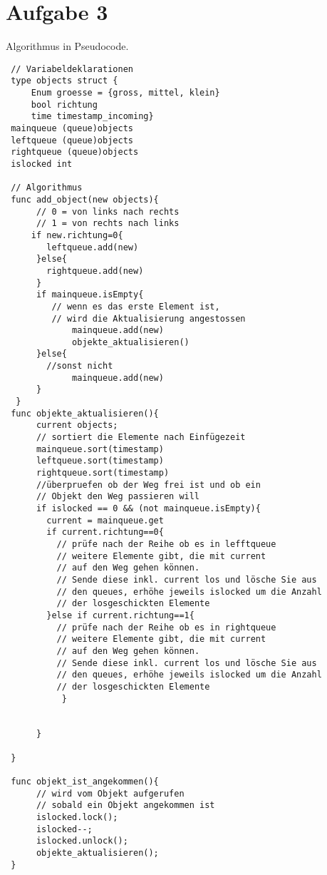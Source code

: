 \documentclass[11pt,a4paper,DIV=10,]{scrartcl}
\begin{document}
\section*{Aufgabe 3}
Algorithmus in Pseudocode.
\begin{lstlisting}
 // Variabeldeklarationen
 type objects struct {
     Enum groesse = {gross, mittel, klein}
     bool richtung
     time timestamp_incoming}
 mainqueue (queue)objects
 leftqueue (queue)objects
 rightqueue (queue)objects
 islocked int
 
 // Algorithmus
 func add_object(new objects){
      // 0 = von links nach rechts
      // 1 = von rechts nach links 
     if new.richtung=0{
	    leftqueue.add(new)
      }else{
	    rightqueue.add(new)
      }
      if mainqueue.isEmpty{
	     // wenn es das erste Element ist,
	     // wird die Aktualisierung angestossen
             mainqueue.add(new)
             objekte_aktualisieren()
      }else{
	    //sonst nicht
             mainqueue.add(new)
      }
  }
 func objekte_aktualisieren(){
      current objects;
      // sortiert die Elemente nach Einfügezeit
      mainqueue.sort(timestamp)
      leftqueue.sort(timestamp)
      rightqueue.sort(timestamp)
      //überpruefen ob der Weg frei ist und ob ein 
      // Objekt den Weg passieren will
      if islocked == 0 && (not mainqueue.isEmpty){
	    current = mainqueue.get
	    if current.richtung==0{
		  // prüfe nach der Reihe ob es in lefftqueue 
		  // weitere Elemente gibt, die mit current
		  // auf den Weg gehen können. 
		  // Sende diese inkl. current los und lösche Sie aus 
		  // den queues, erhöhe jeweils islocked um die Anzahl
		  // der losgeschickten Elemente
	    }else if current.richtung==1{
		  // prüfe nach der Reihe ob es in rightqueue 
		  // weitere Elemente gibt, die mit current
		  // auf den Weg gehen können. 
		  // Sende diese inkl. current los und lösche Sie aus 
		  // den queues, erhöhe jeweils islocked um die Anzahl
		  // der losgeschickten Elemente
           }
	    
	    
      }
 
 }
 
 func objekt_ist_angekommen(){
      // wird vom Objekt aufgerufen
      // sobald ein Objekt angekommen ist
      islocked.lock();
      islocked--;
      islocked.unlock();
      objekte_aktualisieren();
 }
      
 
\end{lstlisting}
\end{document}
